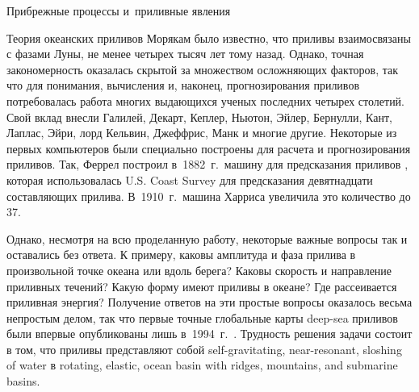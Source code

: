\begin{chapter}{Прибрежные процессы и~приливные явления}
\begin{section}{Теория океанских приливов}
Морякам было известно, что приливы взаимосвязаны с фазами Луны,
не менее четырех тысяч лет тому назад. Однако, точная закономерность
оказалась скрытой за множеством осложняющих факторов, так что для понимания,
вычисления и, наконец, прогнозирования приливов потребовалась работа многих
выдающихся ученых последних четырех столетий. Свой вклад внесли Галилей,
Декарт, Кеплер, Ньютон, Эйлер, Бернулли, Кант, Лаплас, Эйри, 
лорд Кельвин, Джеффрис, Манк и многие другие. 
Некоторые из первых компьютеров были специально построены для расчета
и прогнозирования приливов. Так, Феррел построил в~1882~г.\ машину для
предсказания приливов%
, 
которая использовалась U.S. Coast Survey для предсказания девятнадцати 
составляющих прилива.
В~1910~г.\ машина Харриса%
увеличила это количество до 37.
%

Однако, несмотря на всю проделанную работу, некоторые важные вопросы так
и оставались без ответа. К примеру, каковы амплитуда и фаза прилива в 
произвольной точке океана или вдоль берега? Каковы скорость и направление
приливных течений? Какую форму имеют приливы в океане? 
Где рассеивается приливная энергия? 
Получение ответов на эти простые вопросы оказалось весьма непростым делом,
так что первые точные глобальные карты deep-sea приливов были
впервые опубликованы лишь в~1994~г.~\cite{LeProvost:1994}. 
Трудность решения задачи состоит в том, что приливы представляют собой
self-gravitating, near-resonant, sloshing of water 
в rotating, elastic, ocean basin with ridges, mountains, and submarine
basins.
%


\end{section}
\end{chapter}
